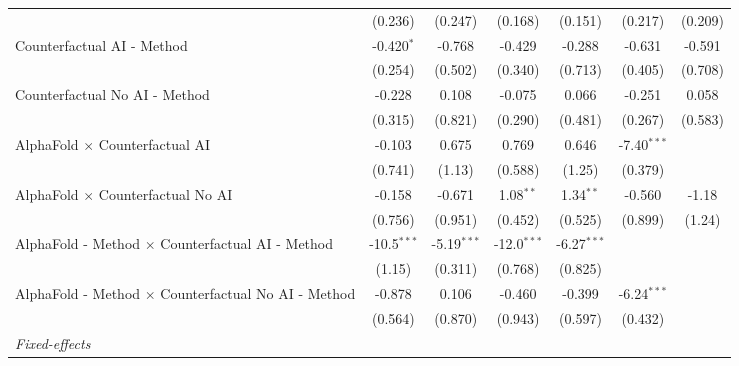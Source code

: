 \begin{tabular}{lcccccc}
                                                              & (0.236)       & (0.247)       & (0.168)       & (0.151)       & (0.217)       & (0.209)\\   
   Counterfactual AI - Method                                 & -0.420$^{*}$  & -0.768        & -0.429        & -0.288        & -0.631        & -0.591\\   
                                                              & (0.254)       & (0.502)       & (0.340)       & (0.713)       & (0.405)       & (0.708)\\   
   Counterfactual No AI - Method                              & -0.228        & 0.108         & -0.075        & 0.066         & -0.251        & 0.058\\   
                                                              & (0.315)       & (0.821)       & (0.290)       & (0.481)       & (0.267)       & (0.583)\\   
   AlphaFold $\times$ Counterfactual AI                       & -0.103        & 0.675         & 0.769         & 0.646         & -7.40$^{***}$ &   \\   
                                                              & (0.741)       & (1.13)        & (0.588)       & (1.25)        & (0.379)       &   \\   
   AlphaFold $\times$ Counterfactual No AI                    & -0.158        & -0.671        & 1.08$^{**}$   & 1.34$^{**}$   & -0.560        & -1.18\\   
                                                              & (0.756)       & (0.951)       & (0.452)       & (0.525)       & (0.899)       & (1.24)\\   
   AlphaFold - Method $\times$ Counterfactual AI - Method     & -10.5$^{***}$ & -5.19$^{***}$ & -12.0$^{***}$ & -6.27$^{***}$ &               &   \\   
                                                              & (1.15)        & (0.311)       & (0.768)       & (0.825)       &               &   \\   
   AlphaFold - Method $\times$ Counterfactual No AI - Method  & -0.878        & 0.106         & -0.460        & -0.399        & -6.24$^{***}$ &   \\   
                                                              & (0.564)       & (0.870)       & (0.943)       & (0.597)       & (0.432)       &   \\   
   \midrule
   \emph{Fixed-effects}\\

\end{tabular}
